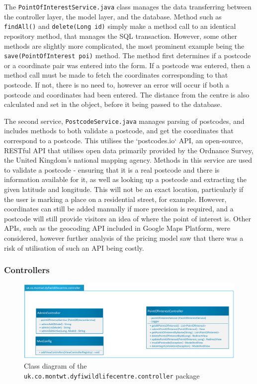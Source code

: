 The \texttt{PointOfInterestService.java} class manages the data transferring between the controller layer, the model layer, and the database. Method such as \texttt{findAll()} and \texttt{delete(Long id)} simply make a method call to an identical repository method, that manages the SQL transaction. However, some other methods are slightly more complicated, the most prominent example being the \texttt{save(PointOfInterest poi)} method. The method first determines if a postcode or a coordinate pair was entered into the form. If a postcode was entered, then a method call must be made to fetch the coordinates corresponding to that postcode. If not, there is no need to, however an error will occur if both a postcode and coordinates had been entered. The distance from the centre is also calculated and set in the object, before it being passed to the database.

The second service, \texttt{PostcodeService.java} manages parsing of postcodes, and includes methods to both validate a postcode, and get the coordinates that correspond to a postcode. This utilises the `postcodes.io` API, an open-source, RESTful API that utilises open data primarily provided by the Ordnance Survey, the United Kingdom's national mapping agency\cite{PostcodesAPI}. Methods in this service are used to validate a postcode - ensuring that it is a real postcode and there is information available for it, as well as looking up a postcode and extracting the given latitude and longitude. This will not be an exact location, particularly if the user is marking a place on a residential street, for example. However, coordinates can still be added manually if more precision is required, and a postcode will still provide visitors an idea of where the point of interest is. Other APIs, such as the geocoding API included in Google Maps Platform, were considered, however further analysis of the pricing model saw that there was a risk of utilisation of such an API being costly.

\subsubsection{Controllers}
\begin{figure}[H]
	\includegraphics[scale=0.6]{diagrams/controller}
	\caption{Class diagram of the \texttt{uk.co.montwt.dyfiwildlifecentre.controller} package}
\end{figure}	

